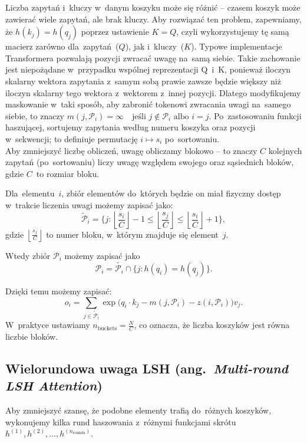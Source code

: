 \documentclass[a4paper,11pt,twoside]{report}
\theoremstyle{definition}
\begin{document}
Liczba zapytań i~kluczy w~danym koszyku może się różnić -- czasem koszyk może zawierać wiele zapytań, ale brak kluczy. Aby rozwiązać ten problem, zapewniamy, że $h(k_j) = h(q_j)$ poprzez ustawienie $K = Q$, czyli wykorzystujemy tę samą macierz zarówno dla~zapytań~($Q$), jak i~kluczy~($K$). Typowe implementacje Transformera pozwalają pozycji zwracać uwagę na~samą siebie. Takie zachowanie jest niepożądane w~przypadku wspólnej reprezentacji Q~i~K, ponieważ iloczyn skalarny wektora zapytania z~samym sobą prawie zawsze będzie większy niż iloczyn skalarny tego wektora z~wektorem z~innej pozycji. Dlatego modyfikujemy maskowanie w~taki sposób, aby zabronić tokenowi zwracania uwagi na~samego siebie, to znaczy
$ m(j, \mathcal{P}_i) = \infty \quad \text{jeśli }j \notin \mathcal{P}_i \text{ albo }i=j$.
Po~zastosowaniu funkcji haszującej, sortujemy zapytania według numeru koszyka oraz pozycji w~sekwencji; to definiuje permutację $i \mapsto s_i$ po~sortowaniu. \\
Aby zmniejszyć liczbę obliczeń, uwagę obliczamy blokowo -- to znaczy $C$ kolejnych zapytań (po~sortowaniu) liczy uwagę względem swojego oraz sąsiednich bloków, gdzie $C$~to rozmiar bloku.

Dla~elementu~$i$, zbiór elementów do~których będzie on miał fizyczny dostęp w~trakcie liczenia uwagi możemy zapisać jako:
\begin{equation}
\tilde{\mathcal{P}}_i = \Big\{j :
\left\lfloor \frac{s_i}{C} \right\rfloor - 1
\le
\left\lfloor \frac{s_j}{C} \right\rfloor 
\le
\left\lfloor \frac{s_i}{C} \right\rfloor +1
\Big\}
,
\end{equation}
gdzie $\left\lfloor \frac{s_j}{C} \right\rfloor$ to numer bloku, w~którym znajduje się element~$j$.

Wtedy zbiór $\mathcal{P}_i$ możemy zapisać jako
\begin{equation}
\mathcal{P}_i = \tilde{\mathcal{P}_i} \cap \Big\{j : h(q_i) = h(q_j) \Big\}
.
\end{equation}

Dzięki temu możemy zapisać:
\begin{equation}
o_i = \sum_{j \in \tilde{\mathcal{P}}_i}\exp\Big(q_i \cdot k_j - m(j, \mathcal{P}_i) - z(i, \mathcal{P}_i)\Big) v_j
.
\end{equation}
W~praktyce ustawiamy $n_\text{buckets} = \frac{N}{C}$, co oznacza, że liczba koszyków jest równa liczbie bloków.



\subsection{Wielorundowa uwaga LSH (ang.\ \emph{Multi-round LSH Attention})}
Aby zmniejszyć szansę, że podobne elementy trafią do~różnych koszyków, wykonujemy kilka rund haszowania z~różnymi funkcjami skrótu $h^{(1)}, h^{(2)}, \ldots, h^{(n_\text{rounds})}$.  
\end{document}
